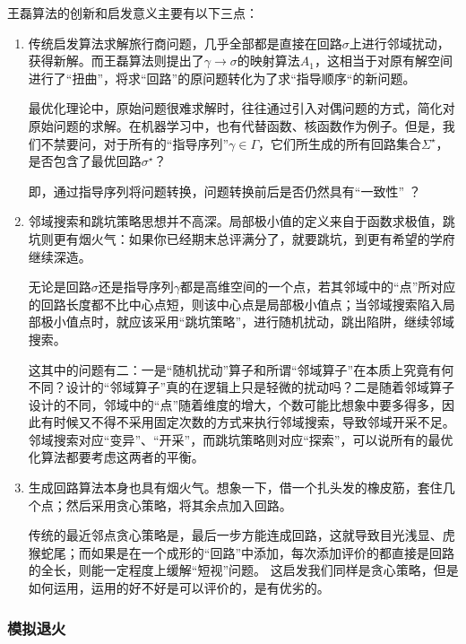 \documentclass[12pt]{ctexart}
\begin{document}
王磊算法的创新和启发意义主要有以下三点：

\begin{enumerate}
    \item 传统启发算法求解旅行商问题，几乎全部都是直接在回路$\sigma$上进行邻域扰动，获得新解。而王磊算法则提出了$\gamma \to \sigma$的映射算法$A_1$，这相当于对原有解空间进行了“扭曲”，将求“回路”的原问题转化为了求“指导顺序“的新问题。

          最优化理论中，原始问题很难求解时，往往通过引入对偶问题的方式，简化对原始问题的求解。在机器学习中，也有代替函数、核函数作为例子。但是，我们不禁要问，对于所有的“指导序列”$\gamma \in \Gamma$，它们所生成的所有回路集合$\Sigma^\star$，是否包含了最优回路$\sigma^\star$？

          即，通过指导序列将问题转换，问题转换前后是否仍然具有“一致性”  ？

    \item 邻域搜索和跳坑策略思想并不高深。局部极小值的定义来自于函数求极值，跳坑则更有烟火气：如果你已经期末总评满分了，就要跳坑，到更有希望的学府继续深造。

          无论是回路$\sigma$还是指导序列$\gamma$都是高维空间的一个点，若其邻域中的“点”所对应的回路长度都不比中心点短，则该中心点是局部极小值点；当邻域搜索陷入局部极小值点时，就应该采用“跳坑策略”，进行随机扰动，跳出陷阱，继续邻域搜索。

          这其中的问题有二：一是“随机扰动”算子和所谓“邻域算子”在本质上究竟有何不同？设计的“邻域算子”真的在逻辑上只是轻微的扰动吗？二是随着邻域算子设计的不同，邻域中的“点”随着维度的增大，个数可能比想象中要多得多，因此有时候又不得不采用固定次数的方式来执行邻域搜索，导致邻域开采不足。邻域搜索对应“变异”、“开采”，而跳坑策略则对应“探索”，可以说所有的最优化算法都要考虑这两者的平衡。

    \item 生成回路算法本身也具有烟火气。想象一下，借一个扎头发的橡皮筋，套住几个点；然后采用贪心策略，将其余点加入回路。

          传统的最近邻点贪心策略是，最后一步方能连成回路，这就导致目光浅显、虎猴蛇尾；而如果是在一个成形的“回路”中添加，每次添加评价的都直接是回路的全长，则能一定程度上缓解“短视”问题。
          这启发我们同样是贪心策略，但是如何运用，运用的好不好是可以评价的，是有优劣的。
\end{enumerate}

\subsubsection{模拟退火}
\end{document}
